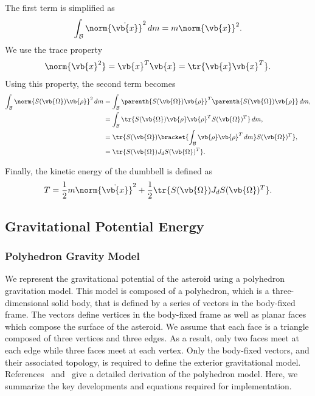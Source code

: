 \documentclass[11pt, reqno]{article}    %
\begin{document}
The first term is simplified as
\begin{align*}
    \int_{\mathcal{B}} \norm{\dot{\vb{x}}}^2 \, dm = m \norm{\vb{x}}^2 .
\end{align*}
We use the trace property
\begin{align*}
    \norm{\vb{x}^2} = \vb{x}^T \vb{x} = \tr{\vb{x} \vb{x}^T} .
\end{align*}
Using this property, the second term becomes
\begin{align*}
    \int_{\mathcal{B}} \norm{S(\vb{\Omega}) \vb{\rho}}^2 \, dm &= \int_{\mathcal{B}} \parenth{S(\vb{\Omega}) \vb{\rho}}^T \parenth{S(\vb{\Omega}) \vb{\rho}}\, dm , \\
    &= \int_{\mathcal{B}} \tr{S(\vb{\Omega}) \vb{\rho} \vb{\rho}^T S(\vb{\Omega})^T}\, dm , \\
    &= \tr{S(\vb{\Omega}) \bracket{\int_{\mathcal{B}} \vb{\rho} \vb{\rho}^T \, dm} S(\vb{\Omega})^T} , \\
    &= \tr{S(\vb{\Omega}) J_d S(\vb{\Omega})^T} .
\end{align*}

Finally, the kinetic energy of the dumbbell is defined as
\begin{align}\label{eq:kinetic_energy}
    T = \frac{1}{2} m \norm{\dot{\vb{x}}}^2 + \frac{1}{2} \tr{S(\vb{\Omega}) J_d S(\vb{\Omega})^T} .
\end{align}

\subsection{Gravitational Potential Energy}\label{ssec:potential_energy}

\subsubsection{Polyhedron Gravity Model}\label{sec:polyhedron_model}

We represent the gravitational potential of the asteroid using a polyhedron gravitation model.
This model is composed of a polyhedron, which is a three-dimensional solid body, that is defined by a series of vectors in the body-fixed frame.
The vectors define vertices in the body-fixed frame as well as planar faces which compose the surface of the asteroid.
We assume that each face is a triangle composed of three vertices and three edges.
As a result, only two faces meet at each edge while three faces meet at each vertex.
Only the body-fixed vectors, and their associated topology, is required to define the exterior gravitational model.
References~\cite{werner1994} and~\cite{werner1996} give a detailed derivation of the polyhedron model.
Here, we summarize the key developments and equations required for implementation.
\end{document}
